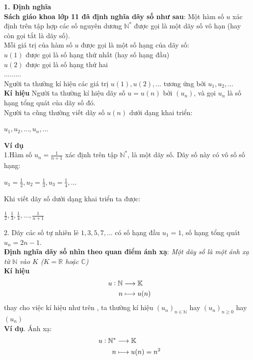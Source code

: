 \documentclass[12pt,oneside,a4paper,reqno]{book}
\begin{document}
{\bf 1. Định nghĩa}\\
{\bf Sách giáo khoa lớp 11 đã định nghĩa dãy số như sau}: Một hàm số $u$ xác định trên tập hợp các số nguyên dương $\mathbb{N^*}$ được gọi là một dãy số vô hạn (hay còn gọi tắt là dãy số).\\
Mỗi giá trị của hàm số $u$ được gọi là một số hạng của dãy số:\\
$u(1)$ được gọi là số hạng thứ nhất (hay số hạng đầu)\\
$u(2)$ được gọi là số hạng thứ hai\\
$... ... ...$\\
Người ta thường kí hiệu các giá trị $u(1), u(2),...$ tương ứng bởi $u_{1},u_{2},...$\\
{\bf Kí hiệu}
Người ta thường kí hiệu dãy số $u=u(n)$ bởi $(u_n)$, và gọi $u_n$ là số hạng tổng quát của dãy số đó.\\
Người ta cũng thường viết dãy số $u(n)$ dưới dạng khai triển:\\
\begin{center}
$u_1, u_2, ... , u_n, ...$
\end{center}
{\bf Ví dụ}\\
1.Hàm số $u_n=\frac{1}{n+1}$ xác định trên tập $\mathbb N^*$, là một dãy số. Dãy số này có vô số số hạng:\\
\begin{center}
$u_1=\frac{1}{2}, u_2=\frac{1}{3}, u_3=\frac{1}{4}, ...$
\end{center}
Khi viết dãy số dưới dạng khai triển ta được:\\
\begin{center}
$\frac{1}{2}, \frac{1}{3}, \frac{1}{4}, ..., \frac{1}{n+1}$
\end{center}
2. Dãy các số tự nhiên lẻ $1, 3, 5, 7, ...$ có số hạng đầu $u_1=1$, số hạng tổng quát $u_n=2n-1$.\\
{\bf Định nghĩa dãy số nhìn theo quan điểm ánh xạ}: \textit{Một dãy số là một ánh xạ từ $\mathbb{N}$ vào $K$ ($K=\mathbb{R}$ hoặc $\mathbb{C}$)}\\
{\bf Kí hiệu}
\begin{align*}
\text{ \space}u:\mathbb{N}&\longrightarrow\mathbb{K}\\
n&\longmapsto u(n)
\end{align*}
thay cho việc kí hiệu như trên , ta thường kí hiệu $(u_n)_{n \in \mathbb{N}}$ hay $(u_n)_{n \ge 0}$ hay $(u_n)$\\
{\bf Ví dụ}. Ánh xạ:
\begin{align*}
\text{ \space}u:\mathbb{N^*}&\longrightarrow\mathbb{K}\\
n&\longmapsto u(n)=n^2
\end{align*}
\end{document}

